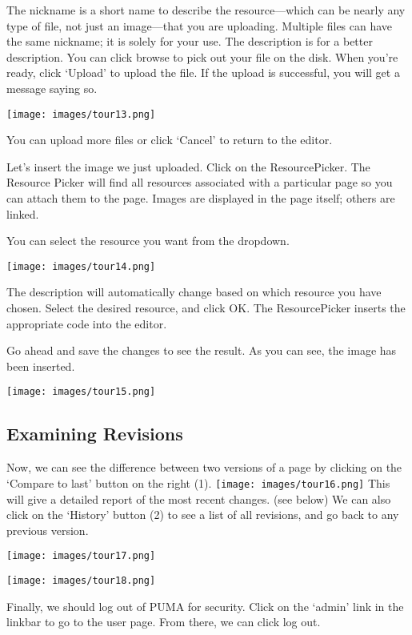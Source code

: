 \documentclass[12pt]{article}
\begin{document}
 The nickname is a short name to describe the resource—which can be nearly any type of file, not just an image—that you are uploading. Multiple files can have the same nickname; it is solely for your use. The description is for a better description. You can click browse to pick out your file on the disk. When you're ready, click `Upload' to upload the file. If the upload is successful, you will get a message saying so.

\texttt{[image: images/tour13.png]} 

 You can upload more files or click `Cancel' to return to the editor.


 Let's insert the image we just uploaded. Click on the ResourcePicker. The Resource Picker will find all resources associated with a particular page so you can attach them to the page. Images are displayed in the page itself; others are linked.


 You can select the resource you want from the dropdown.

\texttt{[image: images/tour14.png]} 

 The description will automatically change based on which resource you have chosen. Select the desired resource, and click OK. The ResourcePicker inserts the appropriate code into the editor.


 Go ahead and save the changes to see the result. As you can see, the image has been inserted.

\texttt{[image: images/tour15.png]} \subsection*{Examining Revisions}

 Now, we can see the difference between two versions of a page by clicking on the `Compare to last' button on the right (1). \texttt{[image: images/tour16.png]}  This will give a detailed report of the most recent changes. (see below) We can also click on the `History' button (2) to see a list of all revisions, and go back to any previous version.

\texttt{[image: images/tour17.png]} 

\texttt{[image: images/tour18.png]} 

 Finally, we should log out of PUMA for security. Click on the `admin' link in the linkbar to go to the user page. From there, we can click log out.
\end{document}

